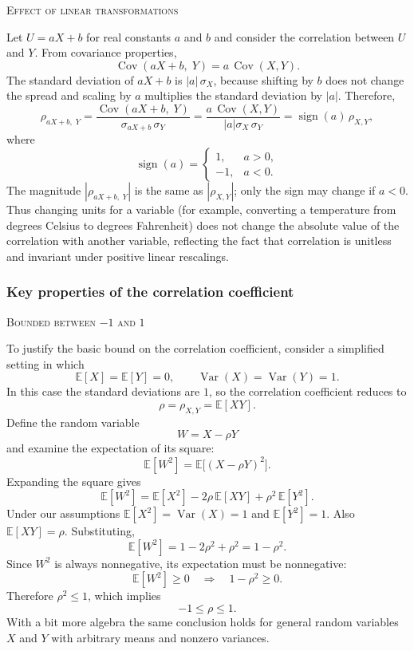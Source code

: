 \bigskip
\textsc{Effect of linear transformations}

Let \(U = aX + b\) for real constants \(a\) and \(b\) and consider the correlation between \(U\) and \(Y\).  
From covariance properties,
\[
\operatorname{Cov}(aX+b,\;Y)
=
a\,\operatorname{Cov}(X,Y).
\]
The standard deviation of \(aX+b\) is \(|a|\,\sigma_X\), because shifting by \(b\) does not change the spread and scaling by \(a\) multiplies the standard deviation by \(|a|\).  
Therefore,
\[
\rho_{aX+b,\;Y}
=
\frac{\operatorname{Cov}(aX+b,\;Y)}{\sigma_{aX+b}\,\sigma_Y}
=
\frac{a\,\operatorname{Cov}(X,Y)}{|a|\sigma_X\,\sigma_Y}
=
\operatorname{sign}(a)\,\rho_{X,Y},
\]
where
\[
\operatorname{sign}(a)
=
\begin{cases}
1, & a>0,\\[4pt]
-1, & a<0.
\end{cases}
\]
The magnitude \(|\rho_{aX+b,\;Y}|\) is the same as \(|\rho_{X,Y}|\); only the sign may change if \(a<0\).  
Thus changing units for a variable (for example, converting a temperature from degrees Celsius to degrees Fahrenheit) does not change the absolute value of the correlation with another variable, reflecting the fact that correlation is unitless and invariant under positive linear rescalings.


\subsubsection{Key properties of the correlation coefficient}

\bigskip
\textsc{Bounded between \(-1\) and \(1\)}

To justify the basic bound on the correlation coefficient, consider a simplified setting in which
\[
\mathbb{E}[X]=\mathbb{E}[Y]=0,
\qquad
\operatorname{Var}(X)=\operatorname{Var}(Y)=1.
\]
In this case the standard deviations are \(1\), so the correlation coefficient reduces to
\[
\rho = \rho_{X,Y} = \mathbb{E}[XY].
\]
Define the random variable
\[
W = X - \rho Y
\]
and examine the expectation of its square:
\[
\mathbb{E}[W^{2}]
=
\mathbb{E}\big[(X-\rho Y)^{2}\big].
\]
Expanding the square gives
\[
\mathbb{E}[W^{2}]
=
\mathbb{E}[X^{2}]
-
2\rho\,\mathbb{E}[XY]
+
\rho^{2}\,\mathbb{E}[Y^{2}].
\]
Under our assumptions \(\mathbb{E}[X^{2}] = \operatorname{Var}(X) = 1\) and \(\mathbb{E}[Y^{2}] = 1\).  
Also \(\mathbb{E}[XY]=\rho\).  
Substituting,
\[
\mathbb{E}[W^{2}]
=
1
-
2\rho^{2}
+
\rho^{2}
=
1-\rho^{2}.
\]
Since \(W^{2}\) is always nonnegative, its expectation must be nonnegative:
\[
\mathbb{E}[W^{2}] \ge 0
\quad\Longrightarrow\quad
1-\rho^{2} \ge 0.
\]
Therefore \(\rho^{2} \le 1\), which implies
\[
-1 \le \rho \le 1.
\]
With a bit more algebra the same conclusion holds for general random variables \(X\) and \(Y\) with arbitrary means and nonzero variances.

